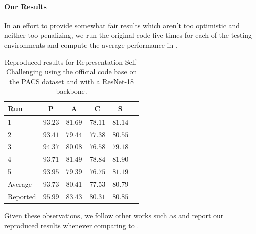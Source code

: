 \paragraph{Our Results}
In an effort to provide somewhat fair results which aren't too optimistic and neither too penalizing, we run the original \rsc code five times for each of the testing environments and compute the average performance in . 

\begin{table}[hb]
    \centering
    \begin{tabular}{lccccc}
    \toprule
    \textbf{Run}   &  \textbf{P} & \textbf{A} & \textbf{C} & \textbf{S} \\
    \midrule
    1    & $93.23$  & $81.69$ & $78.11$ & $81.14$ \\
    2    & $93.41$  & $79.44$ & $77.38$ & $80.55$ \\
    3    & $94.37$  & $80.08$ & $76.58$ & $79.18$ \\
    4    & $93.71$  & $81.49$ & $78.84$ & $81.90$ \\
    5    & $93.95$  & $79.39$ & $76.75$ & $81.19$ \\
    \midrule
    Average & 93.73 & 80.41 & 77.53 & $80.79$ \\
    Reported & $95.99$ & $83.43$ & $80.31$ & $80.85$ \\
    \bottomrule
    \end{tabular}
    \caption[Reproduced results for Representation Self-Challenging using the official code base]{Reproduced results for Representation Self-Challenging using the official code base on the PACS dataset and with a ResNet-18 backbone.} 
    \label{tab:reproduced-RSC}
\end{table}

Given these observations, we follow other works such as \citet{nuriel2020permuted} and report our reproduced results whenever comparing to \rsc.

